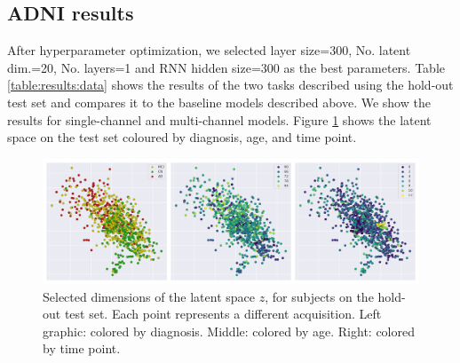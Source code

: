 \subsection{ADNI results}

After hyperparameter optimization, we selected layer size=300, No. latent dim.=20, No. layers=1 and RNN hidden size=300 as the best parameters. Table \ref{table:results:data} shows the results of the two tasks described using the hold-out test set and compares it to the baseline models described above. We show the results for single-channel and multi-channel models. Figure \ref{fig:rnn:latent} shows the latent space on the test set coloured by diagnosis, age, and time point. 

\begin{table}[!htbp]
\centering
{}
\caption[Performance of the model.]{Performance of the models on longitudinal prediction and channel reconstruction, compared to baseline methods. RVAE: single-channel model.  MC-RVAE: multiple channel model. All values are mean absolute error (MAE) over each subject and time point.} \label{table:results:data}
\end{table}


\begin{figure}[!htbp]
  \centering
  \includegraphics[width=1.0\textwidth]{figures/rnnvae/latent_space_fig.png}
  \caption[Latent space for the test set.]{Selected dimensions of the latent space $z$, for subjects on the hold-out test set. Each point represents a different acquisition. Left graphic: colored by diagnosis. Middle: colored by age. Right: colored by time point.}\label{fig:rnn:latent}
\end{figure}

